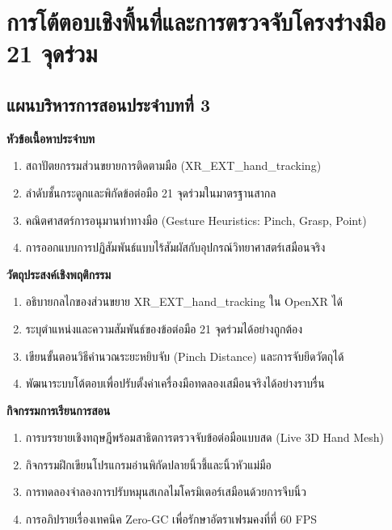 \chapter{การโต้ตอบเชิงพื้นที่และการตรวจจับโครงร่างมือ 21 จุดร่วม}
\label{chap:ch03}

\section*{แผนบริหารการสอนประจำบทที่ 3}

\noindent\textbf{หัวข้อเนื้อหาประจำบท}
\begin{enumerate}
    \item สถาปัตยกรรมส่วนขยายการติดตามมือ (XR\_EXT\_hand\_tracking)
    \item ลำดับชั้นกระดูกและพิกัดข้อต่อมือ 21 จุดร่วมในมาตรฐานสากล
    \item คณิตศาสตร์การอนุมานท่าทางมือ (Gesture Heuristics: Pinch, Grasp, Point)
    \item การออกแบบการปฏิสัมพันธ์แบบไร้สัมผัสกับอุปกรณ์วิทยาศาสตร์เสมือนจริง
\end{enumerate}

\noindent\textbf{วัตถุประสงค์เชิงพฤติกรรม}
\begin{enumerate}
    \item อธิบายกลไกของส่วนขยาย XR\_EXT\_hand\_tracking ใน OpenXR ได้
    \item ระบุตำแหน่งและความสัมพันธ์ของข้อต่อมือ 21 จุดร่วมได้อย่างถูกต้อง
    \item เขียนขั้นตอนวิธีคำนวณระยะหยิบจับ (Pinch Distance) และการจับยึดวัตถุได้
    \item พัฒนาระบบโต้ตอบเพื่อปรับตั้งค่าเครื่องมือทดลองเสมือนจริงได้อย่างราบรื่น
\end{enumerate}

\newpage

\noindent\textbf{กิจกรรมการเรียนการสอน}
\begin{enumerate}
    \item การบรรยายเชิงทฤษฎีพร้อมสาธิตการตรวจจับข้อต่อมือแบบสด (Live 3D Hand Mesh)
    \item กิจกรรมฝึกเขียนโปรแกรมอ่านพิกัดปลายนิ้วชี้และนิ้วหัวแม่มือ
    \item การทดลองจำลองการปรับหมุนสเกลไมโครมิเตอร์เสมือนด้วยการจีบนิ้ว
    \item การอภิปรายเรื่องเทคนิค Zero-GC เพื่อรักษาอัตราเฟรมคงที่ที่ 60 FPS
\end{enumerate}

